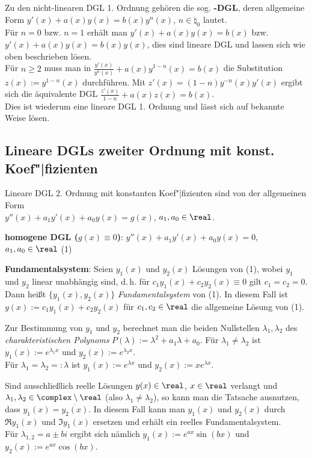 Zu den nicht-linearen DGL 1. Ordnung
gehören die sog. \textbf{-DGL}, deren
allgemeine Form
$y'(x) + a(x) y(x) = b(x) y^n(x)$, $n \in \natural_0$ lautet. \\
Für $n = 0$ bzw. $n = 1$ erhält man
$y'(x) + a(x) y(x) = b(x)$ bzw.
$y'(x) + a(x) y(x) = b(x) y(x)$,
dies sind lineare DGL und lassen sich wie oben beschrieben lösen. \\
Für $n \ge 2$ muss man in
$\frac{y'(x)}{y^n(x)} + a(x) y^{1-n}(x) = b(x)$ die Substitution
$z(x) := y^{1-n}(x)$ durchführen.
Mit $z'(x) = (1 - n) y^{-n}(x) y'(x)$ ergibt sich
die äquivalente DGL $\frac{z'(x)}{1 - n} + a(x) z(x) = b(x)$. \\
Dies ist wiederum eine lineare DGL 1. Ordnung
und lässt sich auf bekannte Weise lösen.

\pagebreak

\subsection{%
    Lineare DGLs zweiter Ordnung mit konst. Koef"|fizienten%
}

Lineare DGL 2. Ordnung mit konstanten Koef"|fizienten sind von der
allgemeinen Form \\
$y''(x) + a_1 y'(x) + a_0 y(x) = g(x)$, $a_1, a_0 \in \real$.

\linie

\textbf{homogene DGL ($g(x) \equiv 0$)}:
$y''(x) + a_1 y'(x) + a_0 y(x) = 0$, $a_1, a_0 \in \real$ \qquad (1)

\textbf{Fundamentalsystem}:
Seien $y_1(x)$ und $y_2(x)$ Lösungen von (1), wobei $y_1$ und $y_2$ linear
unabhängig sind, d.\,h. für $c_1 y_1(x) + c_2 y_2(x) \equiv 0$ gilt
$c_1 = c_2 = 0$. \\
Dann heißt $\{y_1(x), y_2(x)\}$ \emph{Fundamentalsystem} von (1).
In diesem Fall ist \\
$y(x) := c_1 y_1(x) + c_2 y_2(x)$ für $c_1, c_2 \in \real$
die allgemeine Lösung von (1).

Zur Bestimmung von $y_1$ und $y_2$ berechnet man die beiden Nullstellen
$\lambda_1, \lambda_2$ des \emph{charakteristischen Polynoms}
$P(\lambda) := \lambda^2 + a_1 \lambda + a_0$.
Für $\lambda_1 \not= \lambda_2$ ist $y_1(x) := e^{\lambda_1 x}$
und $y_2(x) := e^{\lambda_2 x}$. \\
Für $\lambda_1 = \lambda_2 =: \lambda$ ist
$y_1(x) := e^{\lambda x}$ und $y_2(x) := x e^{\lambda x}$.

Sind ausschließlich reelle Lösungen $y(x) \in \real$, $x \in \real$ verlangt
und $\lambda_1, \lambda_2 \in \complex \setminus \real$
(also $\lambda_1 \not= \lambda_2$), so kann man die Tatsache
ausnutzen, dass $y_1(x) = \overline{y_2(x)}$.
In diesem Fall kann man $y_1(x)$ und $y_2(x)$ durch
$\Re y_1(x)$ und $\Im y_1(x)$ ersetzen und erhält ein reelles
Fundamentalsystem. \\
Für $\lambda_{1,2} = a \pm bi$ ergibt sich nämlich
$y_1(x) := e^{ax} \sin(bx)$ und $y_2(x) := e^{ax} \cos(bx)$.

